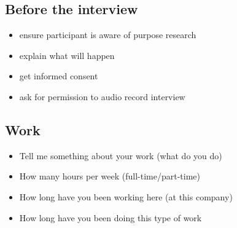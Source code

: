 \subsection{Before the interview}
\begin{itemize}
\item 
ensure participant is aware of purpose research 
\item 
explain what will happen
\item 
get informed consent
\item 
ask for permission to audio record interview
\end{itemize}
\subsection{Work}
\begin{itemize}
\item Tell me something about your work (what do you do)
\item  How many hours per week (full-time/part-time)
\item How long have you been working here (at this company) \item How long have you been doing this type of work
\end{itemize}

